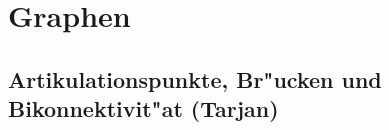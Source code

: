 \section{Graphen}


%

\subsection{Artikulationspunkte, Br"ucken und Bikonnektivit"at (Tarjan)}

%



%



%



